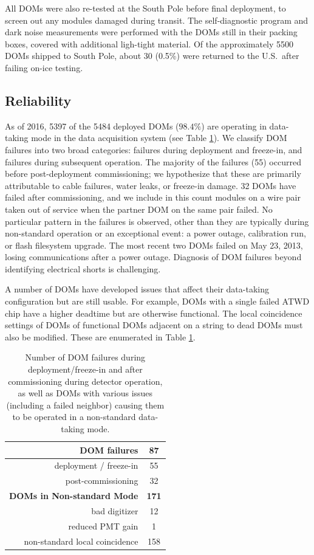 All DOMs were also re-tested at the South Pole before final deployment, to
screen out any modules damaged during transit.  The self-diagnostic
program and dark noise measurements were performed with the DOMs still in
their packing boxes, covered with additional ligh-tight material.  Of the
approximately 5500 DOMs shipped to South Pole, about 30 (0.5\%) were
returned to the U.S.~after failing on-ice testing.    

\subsection{\label{sec:reliability}Reliability}

As of 2016, 5397 of the 5484 deployed DOMs ($98.4\%$) are operating in
data-taking mode in the data acquisition system (see Table
\ref{tab:dom_failures}).  We classify DOM 
failures into two broad categories: failures during deployment and
freeze-in, and failures during subsequent operation.  The majority of the
failures (55) occurred before post-deployment commissioning; we hypothesize
that these are primarily attributable to cable failures, water leaks,
or freeze-in damage. 32 DOMs have failed after commissioning, and
we include in this count modules on a wire pair taken out of service when
the partner DOM on the same pair failed.  No particular pattern in the
failures is observed, other than they are typically during non-standard
operation or an exceptional event: a power outage, calibration run, or
flash filesystem upgrade.  The most recent two DOMs failed on May 23, 2013,
losing communications after a power outage.  Diagnosis of DOM failures
beyond identifying electrical shorts is challenging.

A number of DOMs have developed issues that affect their data-taking
configuration but are still usable.  For example, DOMs with a single failed
ATWD chip have a higher deadtime but are otherwise functional.  The local
coincidence settings of DOMs of functional DOMs adjacent on a string to
dead DOMs must also be modified. These are enumerated in Table \ref{tab:dom_failures}.  

\begin{table}[h]
  \centering
  \caption{Number of DOM failures during deployment/freeze-in and after
    commissioning during detector operation, as well as DOMs with various
    issues (including a failed neighbor) causing them to be operated in a
    non-standard data-taking mode.} 
  \label{tab:dom_failures}
  \begin{tabular}{| r | c |}
    \hline
    \bf{DOM failures} & \bf{87} \\
    \hline    
    deployment / freeze-in & 55 \\
    post-commissioning & 32 \\
    \hline
    \hline
    \bf{DOMs in Non-standard Mode} & \bf{171} \\
    \hline
    bad digitizer & 12 \\
    reduced PMT gain & 1 \\
    non-standard local coincidence & 158 \\
    \hline    
  \end{tabular}
\end{table}

